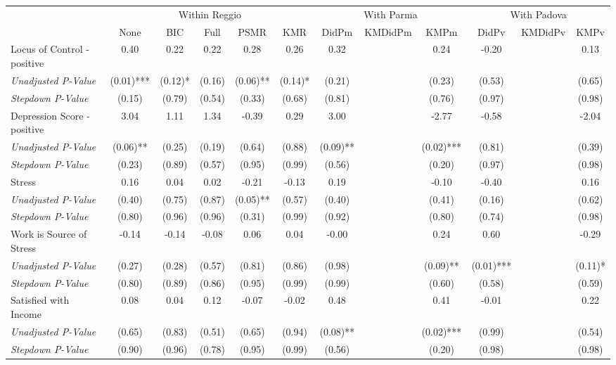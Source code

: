 \begin{tabular}{l c c c c c c c c c c c}
\toprule
& \multicolumn{5}{c}{Within Reggio} & \multicolumn{3}{c}{With Parma} & \multicolumn{3}{c}{With Padova} \\\cmidrule(lr){2-6} \cmidrule(lr){7-9} \cmidrule(lr){10-12}
 & None & BIC & Full & PSMR & KMR & DidPm & KMDidPm & KMPm & DidPv & KMDidPv & KMPv \\
\midrule
Locus of Control - positive & 0.40 & 0.22 & 0.22 & 0.28 & 0.26 & 0.32 & & 0.24 & -0.20 & & 0.13 \\
\quad \textit{Unadjusted P-Value} & (0.01)*** & (0.12)* & (0.16) & (0.06)** & (0.14)* & (0.21) & & (0.23) & (0.53) & & (0.65) \\
\quad \textit{Stepdown P-Value} & (0.15) & (0.79) & (0.54) & (0.33) & (0.68) & (0.81) & & (0.76) & (0.97) & & (0.98) \\
Depression Score - positive & 3.04 & 1.11 & 1.34 & -0.39 & 0.29 & 3.00 & & -2.77 & -0.58 & & -2.04 \\
\quad \textit{Unadjusted P-Value} & (0.06)** & (0.25) & (0.19) & (0.64) & (0.88) & (0.09)** & & (0.02)*** & (0.81) & & (0.39) \\
\quad \textit{Stepdown P-Value} & (0.23) & (0.89) & (0.57) & (0.95) & (0.99) & (0.56) & & (0.20) & (0.97) & & (0.98) \\
Stress & 0.16 & 0.04 & 0.02 & -0.21 & -0.13 & 0.19 & & -0.10 & -0.40 & & 0.16 \\
\quad \textit{Unadjusted P-Value} & (0.40) & (0.75) & (0.87) & (0.05)** & (0.57) & (0.40) & & (0.41) & (0.16) & & (0.62) \\
\quad \textit{Stepdown P-Value} & (0.80) & (0.96) & (0.96) & (0.31) & (0.99) & (0.92) & & (0.80) & (0.74) & & (0.98) \\
Work is Source of Stress & -0.14 & -0.14 & -0.08 & 0.06 & 0.04 & -0.00 & & 0.24 & 0.60 & & -0.29 \\
\quad \textit{Unadjusted P-Value} & (0.27) & (0.28) & (0.57) & (0.81) & (0.86) & (0.98) & & (0.09)** & (0.01)*** & & (0.11)* \\
\quad \textit{Stepdown P-Value} & (0.80) & (0.89) & (0.86) & (0.95) & (0.99) & (0.99) & & (0.60) & (0.58) & & (0.59) \\
Satisfied with Income & 0.08 & 0.04 & 0.12 & -0.07 & -0.02 & 0.48 & & 0.41 & -0.01 & & 0.22 \\
\quad \textit{Unadjusted P-Value} & (0.65) & (0.83) & (0.51) & (0.65) & (0.94) & (0.08)** & & (0.02)*** & (0.99) & & (0.54) \\
\quad \textit{Stepdown P-Value} & (0.90) & (0.96) & (0.78) & (0.95) & (0.99) & (0.56) & & (0.20) & (0.98) & & (0.98) \\

\end{tabular}
